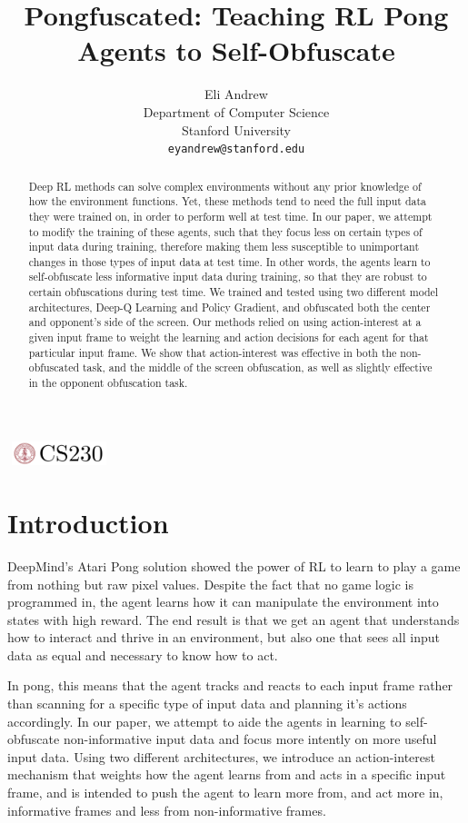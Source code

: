 \documentclass{article}
\title{Pongfuscated: Teaching RL Pong Agents to Self-Obfuscate}
\author{
  Eli Andrew\\
  Department of Computer Science\\
  Stanford University\\
  \texttt{eyandrew@stanford.edu} \\
}
\begin{document}
\begin{center}
\includegraphics[width=3cm, height=0.7cm]{CS230}
\end{center}

\maketitle

\begin{abstract}

Deep RL methods can solve complex environments without any prior knowledge of how the environment functions. Yet, these
methods tend to need the full input data they were trained on, in order to perform well at test time. In our paper, we
attempt to modify the training of these agents, such that they focus less on certain types of input data during training,
therefore making them less susceptible to unimportant changes in those types of input data at test time. In other words, the agents learn to
self-obfuscate less informative input data during training, so that they are robust to certain obfuscations during test time. 
We trained and tested using two different model architectures, Deep-Q Learning and Policy Gradient, and obfuscated both the 
center and opponent's side of the screen. Our methods relied on using action-interest at a given input frame to weight the 
learning and action decisions for each agent for that particular input frame. We show that action-interest was effective in both the non-obfuscated 
task, and the middle of the screen obfuscation, as well as slightly effective in the opponent obfuscation task.


\end{abstract}

\section{Introduction}	
DeepMind's Atari Pong solution showed the power of RL to learn to play a game from nothing but raw pixel values. Despite the fact that no
game logic is programmed in, the agent learns how it can manipulate the environment into states with high reward. The end result is that we get an agent that understands how to interact 
and thrive in an environment, but also one that sees all input data as equal and necessary to know how to act.

In pong, this means that the agent tracks and reacts to each input frame rather than scanning for a specific type of input data and planning it's actions
accordingly. In our paper, we attempt to aide the agents in learning to self-obfuscate non-informative input data and focus more intently on
more useful input data. Using two different architectures, we introduce an action-interest mechanism that weights how the agent learns from and acts in a specific
input frame, and is intended to push the agent to learn more from, and act more in, informative frames and less from non-informative frames.
\end{document}

